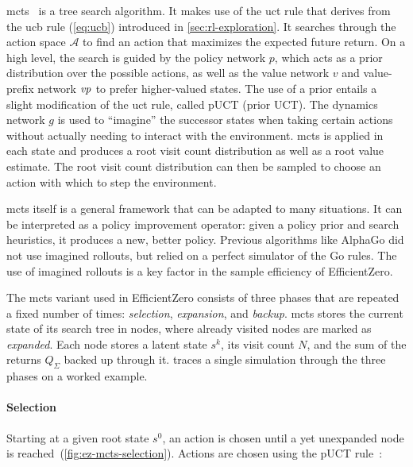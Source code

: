 \Gls{mcts}~\cite{hutchison_bandit_2006,hutchison_efficient_2007} is a tree search
algorithm. It makes use of the \gls{uct} rule that derives from the \gls{ucb} rule (\cref{eq:ucb}) introduced in
\cref{sec:rl-exploration}.
It searches through the action space $\mathcal{A}$ to find an action that maximizes the
expected future return.
On a high level, the search is guided by the policy network $p$, which acts as
a prior distribution over the possible actions, as well as the value network
$v$ and value-prefix network $\mathit{vp}$ to prefer higher-valued states.
The use of a prior entails a slight modification of the \gls{uct} rule, called pUCT (prior UCT).
The dynamics network $g$ is used to \enquote{imagine} the successor states when
taking certain actions without actually needing to interact with the environment.
\gls{mcts} is applied in each state and produces a root visit count distribution as well
as a root value estimate.
The root visit count distribution can then be sampled to choose an action with
which to step the environment.

\gls{mcts} itself is a general framework that can be adapted to many situations.
It can be interpreted as a policy improvement operator: given a policy prior
and search heuristics, it produces a new, better policy.
Previous algorithms like AlphaGo did not use imagined rollouts, but relied on a perfect simulator
of the Go rules.
The use of imagined rollouts is a key factor in the sample efficiency of EfficientZero.

The \gls{mcts} variant used in EfficientZero consists of three phases that are
repeated a fixed number of times: \emph{selection},
\emph{expansion}, and
\emph{backup}.
\gls{mcts} stores the current state of its search tree in nodes, where
already visited nodes are marked as \emph{expanded}.
Each node stores a latent state $s^k$, its visit count $N$, and the sum of the
returns $Q_\Sigma$ backed up through it.
 traces a single simulation through the three
phases on a worked example.



\paragraph{Selection}\label{sec:ez-mcts-selection}
Starting at a given root state $s^0$, an action is chosen until a yet unexpanded
node is reached~(\cref{fig:ez-mcts-selection}).
Actions are chosen using the pUCT rule~\cite{schrittwieser_mastering_2020}:

